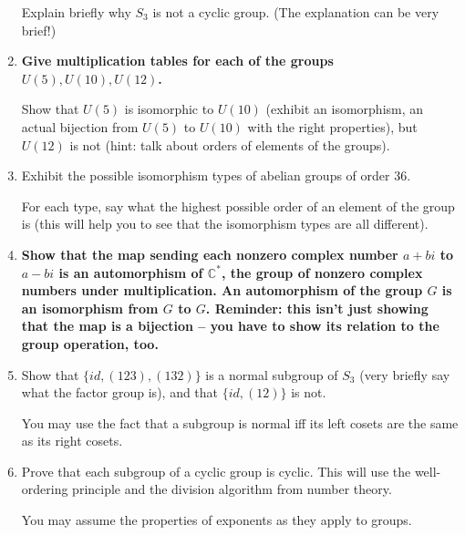 \documentclass[12pt]{article}
\begin{document}
\begin{enumerate}
Explain briefly why $S_3$ is not a cyclic group.  (The explanation can be very brief!)




\item  {\bf Give multiplication tables for each of the groups $U(5), U(10), U(12)$. 

Show that $U(5)$ is isomorphic to $U(10)$ (exhibit an isomorphism, an actual bijection from $U(5)$ to $U(10)$ with the right properties), but $U(12)$ is not (hint:  talk about orders of elements of the groups).}



\item  Exhibit the possible isomorphism types of abelian groups of order 36.

For each type, say what the highest possible order of an element of the group is (this will help you to see that the isomorphism types are all different).



\item {\bf Show that the map sending each nonzero complex number $a+bi$ to $a-bi$ is an automorphism of ${\mathbb C}^*$, the group of nonzero complex numbers under multiplication.  An automorphism of the group $G$ is an isomorphism from $G$ to $G$.  Reminder:  this isn't just showing that the map is a bijection -- you have to show its relation to the group operation, too.}



\item  Show that $\{id, (123),(132)\}$ is a normal subgroup of $S_3$ (very briefly say what the factor group is), and that $\{id,(12)\}$ is not.

You may use the fact that a subgroup is normal iff its left cosets are the same as its right cosets.



\item  Prove that each subgroup of a cyclic group is cyclic.  This will use the well-ordering principle and the division algorithm from number theory.

You may assume the properties of exponents as they apply to groups.

\end{enumerate}
\end{document}

